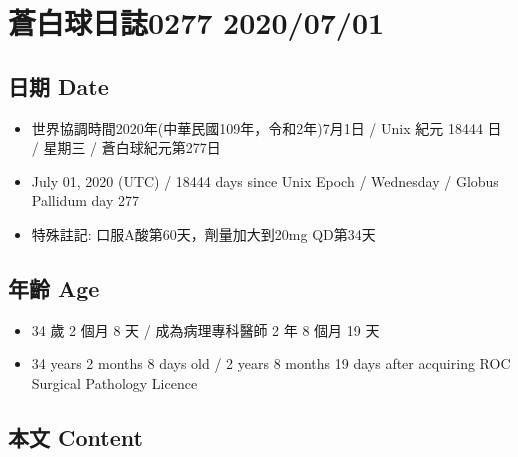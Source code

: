 \documentclass[
]{article}
\author{}
\date{}
\providecommand{\tightlist}{%
  \setlength{\itemsep}{0pt}\setlength{\parskip}{0pt}}
\begin{document}
\hypertarget{ux84bcux767dux7403ux65e5ux8a8c0277-20200701}{%
\section{蒼白球日誌0277
2020/07/01}\label{ux84bcux767dux7403ux65e5ux8a8c0277-20200701}}

\hypertarget{ux65e5ux671f-date}{%
\subsection{日期 Date}\label{ux65e5ux671f-date}}

\begin{itemize}
\tightlist
\item
  世界協調時間2020年(中華民國109年，令和2年)7月1日 / Unix 紀元 18444 日
  / 星期三 / 蒼白球紀元第277日
\item
  July 01, 2020 (UTC) / 18444 days since Unix Epoch / Wednesday / Globus
  Pallidum day 277
\item
  特殊註記: 口服A酸第60天，劑量加大到20mg QD第34天
\end{itemize}

\hypertarget{ux5e74ux9f61-age}{%
\subsection{年齡 Age}\label{ux5e74ux9f61-age}}

\begin{itemize}
\tightlist
\item
  34 歲 2 個月 8 天 / 成為病理專科醫師 2 年 8 個月 19 天
\item
  34 years 2 months 8 days old / 2 years 8 months 19 days after
  acquiring ROC Surgical Pathology Licence
\end{itemize}

\hypertarget{ux672cux6587-content}{%
\subsection{本文 Content}\label{ux672cux6587-content}}
\end{document}
